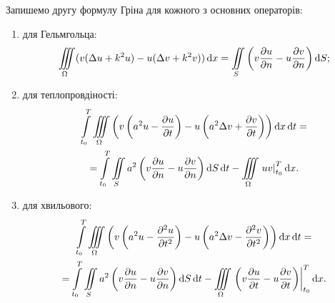 Запишемо другу формулу Гріна для кожного з основних операторів:
\begin{enumerate}
    \item для Гельмгольца: 
    \begin{equation}
        \displaystyle\iiint\limits_\Omega ( v (\Delta u + k^2 u) - u (\Delta v + k^2 v)) \mathop{}\!\mathrm{d} x = \displaystyle\iint\limits_S \left( v \frac{\partial u}{\partial n} - u \frac{\partial v}{\partial n} \right) \mathop{}\!\mathrm{d} S;
    \end{equation}
    \item для теплопровдіності:
    \begin{multline}
        \displaystyle\int\limits_{t_0}^T \displaystyle\iiint\limits_\Omega \left( v \left( a^2 u - \frac{\partial u}{\partial t} \right) - u \left( a^2 \Delta v + \frac{\partial v}{\partial t} \right) \right) \mathop{}\!\mathrm{d} x \mathop{}\!\mathrm{d} t = \\
        = \displaystyle\int\limits_{t_0}^T \displaystyle\iint\limits_S a^2 \left( v \frac{\partial u}{\partial n} - u \frac{\partial v}{\partial n} \right) \mathop{}\!\mathrm{d} S \mathop{}\!\mathrm{d} t- \displaystyle\iiint\limits_\Omega \left. u v \right|_{t_0}^T \mathop{}\!\mathrm{d} x.
    \end{multline}
    \item для хвильового:
    \begin{multline}
        \displaystyle\int\limits_{t_0}^T \displaystyle\iiint\limits_\Omega \left( v \left( a^2 u - \frac{\partial^2 u}{\partial t^2} \right) - u \left( a^2 \Delta v - \frac{\partial^2 v}{\partial t^2} \right) \right) \mathop{}\!\mathrm{d} x \mathop{}\!\mathrm{d} t = \\
        = \displaystyle\int\limits_{t_0}^T \displaystyle\iint\limits_S a^2 \left( v \frac{\partial u}{\partial n} - u \frac{\partial v}{\partial n} \right) \mathop{}\!\mathrm{d} S \mathop{}\!\mathrm{d} t - \displaystyle\iiint\limits_\Omega \left. \left( v \frac{\partial u}{\partial t} - u \frac{\partial v}{\partial t} \right) \right|_{t_0}^T \mathop{}\!\mathrm{d} x.
    \end{multline}
\end{enumerate}